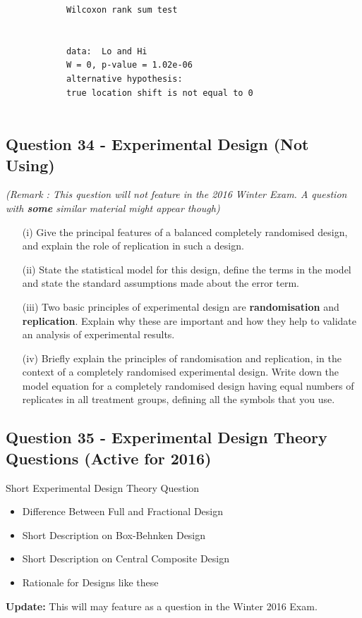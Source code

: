 \documentclass[a4paper,12pt]{article}
\begin{document}
\begin{itemize}
\begin{itemize}
\begin{framed}
\begin{verbatim}
			Wilcoxon rank sum test
			
			
			data:  Lo and Hi
			W = 0, p-value = 1.02e-06
			alternative hypothesis: 
			true location shift is not equal to 0
			
			\end{verbatim}
		\end{framed}
	\end{itemize}
	
\end{itemize} %

\subsection*{Question 34 - Experimental Design (Not Using)}
\textit{(Remark : This question will not feature in the 2016 Winter Exam. A question with \textbf{some} similar material might appear though)}
\begin{itemize}
	\item[(i)] Give the principal features of a  balanced completely randomised design, and
	explain the role of replication in such a design.  \item[(ii)] State the statistical model for
	this design, define the terms in the model and state the standard assumptions
	made about the error term.
	\item[(iii)] Two basic principles of experimental design are \textbf{randomisation} and
	\textbf{replication}. Explain why these are important and how they help to
	validate an analysis of experimental results. 
	\item[(iv)] Briefly explain the principles of randomisation and replication, in the
	context of a completely randomised experimental design. Write down the model equation for a completely randomised design
	having equal numbers of replicates in all treatment groups, defining all
	the symbols that you use.
\end{itemize}
\subsection*{Question 35 - Experimental Design Theory Questions (Active for 2016)}
Short Experimental Design Theory Question
\begin{itemize}
	\item Difference Between Full and Fractional Design
	\item Short Description on Box-Behnken Design
	\item Short Description on Central Composite Design
	\item Rationale for Designs like these
\end{itemize}
\textbf{Update:} This will may feature as a question in the Winter 2016 Exam.
\end{document}
